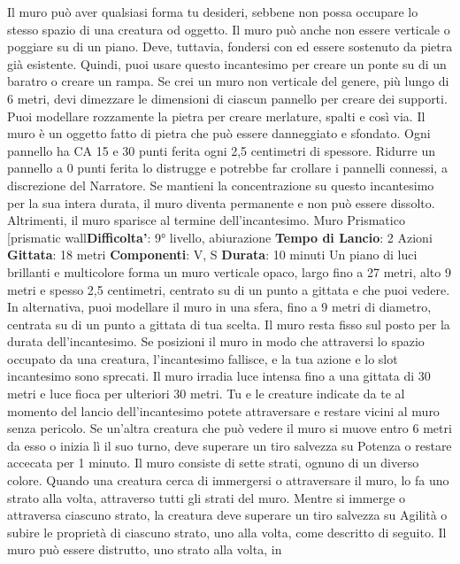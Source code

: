 \begin{multicols}{2}
Il muro può aver qualsiasi forma tu desideri, sebbene
non possa occupare lo stesso spazio di una creatura od
oggetto. Il muro può anche non essere verticale o
poggiare su di un piano. Deve, tuttavia, fondersi con ed
essere sostenuto da pietra già esistente. Quindi, puoi
usare questo incantesimo per creare un ponte su di un
baratro o creare un rampa.
Se crei un muro non verticale del genere, più lungo di 6
metri, devi dimezzare le dimensioni di ciascun pannello
per creare dei supporti. Puoi modellare rozzamente la
pietra per creare merlature, spalti e così via.
Il muro è un oggetto fatto di pietra che può essere
danneggiato e sfondato. Ogni pannello ha CA 15 e 30
punti ferita ogni 2,5 centimetri di spessore. Ridurre un
pannello a 0 punti ferita lo distrugge e potrebbe far
crollare i pannelli connessi, a discrezione del Narratore.
Se mantieni la concentrazione su questo incantesimo
per la sua intera durata, il muro diventa permanente e
non può essere dissolto. Altrimenti, il muro sparisce al
termine dell’incantesimo.
Muro Prismatico
[prismatic wall\textbf{Difficolta'}:
9° livello, abiurazione
\textbf{Tempo di Lancio}: 2 Azioni
\textbf{Gittata}: 18 metri
\textbf{Componenti}: V, S
\textbf{Durata}: 10 minuti
Un piano di luci brillanti e multicolore forma un muro
verticale opaco, largo fino a 27 metri, alto 9 metri e
spesso 2,5 centimetri, centrato su di un punto a gittata
e che puoi vedere. In alternativa, puoi modellare il muro
in una sfera, fino a 9 metri di diametro, centrata su di un
punto a gittata di tua scelta. Il muro resta fisso sul posto
per la durata dell’incantesimo. Se posizioni il muro in
modo che attraversi lo spazio occupato da una
creatura, l’incantesimo fallisce, e la tua azione e lo slot
incantesimo sono sprecati.
Il muro irradia luce intensa fino a una gittata di 30 metri
e luce fioca per ulteriori 30 metri. Tu e le creature
indicate da te al momento del lancio dell’incantesimo
potete attraversare e restare vicini al muro senza
pericolo. Se un’altra creatura che può vedere il muro si
muove entro 6 metri da esso o inizia lì il suo turno, deve
superare un tiro salvezza su Potenza o restare
accecata per 1 minuto.
Il muro consiste di sette strati, ognuno di un diverso
colore. Quando una creatura cerca di immergersi o
attraversare il muro, lo fa uno strato alla volta,
attraverso tutti gli strati del muro. Mentre si immerge o
attraversa ciascuno strato, la creatura deve superare un
tiro salvezza su Agilità o subire le proprietà di
ciascuno strato, uno alla volta, come descritto di
seguito.
Il muro può essere distrutto, uno strato alla volta, in

\end{multicols}
